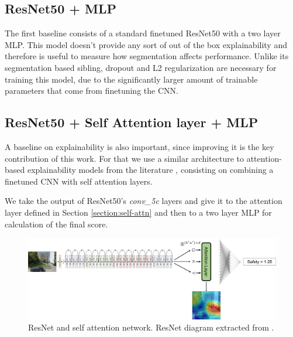 \subsection{ResNet50 + MLP}
The first baseline consists of a standard finetuned ResNet50 with a two layer MLP. This
model doesn't provide any sort of out of the box explainability and therefore is useful
to measure how segmentation affects performance.
Unlike its segmentation based sibling, dropout and L2 regularization are necessary for training
this model, due to the significantly larger amount of trainable parameters that come from finetuning the CNN.

\subsection{ResNet50 + Self Attention layer + MLP}

A baseline on explainability is also important, since improving it is the key contribution
of this work. For that we use a similar architecture to attention-based explainability
models from the literature \cite{zhang_interpretable, cordonnier_relationship, bello_attention}, consisting on
combining a finetuned CNN with self attention layers.

We take the output of ResNet50's \textit{conv\_5c} layers and give it to the attention layer
defined in Section \ref{section:self-attn} and then to a two layer MLP for calculation of the final score.

\begin{figure}[ht]
	\begin{center}
	\includegraphics[width=1\textwidth]{./figures/attn_baseline.png}
	\caption[ResNet + SelfAttention]{ResNet and self attention network. ResNet diagram extracted from .}
	\label{fig:attn_resnet}
	\end{center}
\end{figure}